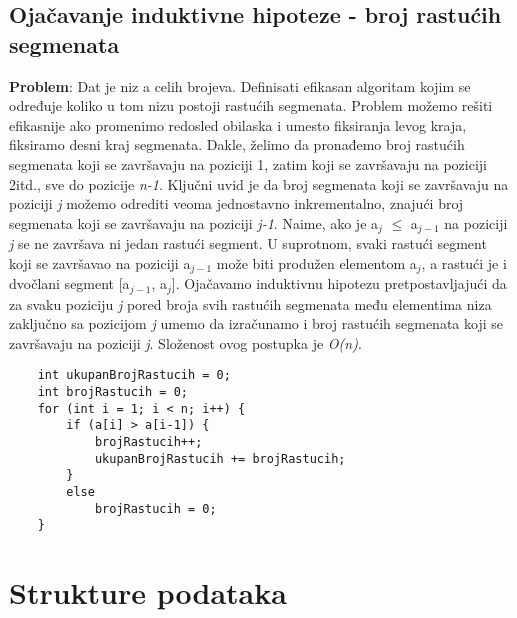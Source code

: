 \documentclass{article}
\begin{document}
\subsection{Ojačavanje induktivne hipoteze - broj rastućih segmenata}
\textbf{Problem}: Dat je niz a celih brojeva. Definisati efikasan algoritam kojim se određuje koliko u tom nizu postoji rastućih segmenata.
\newline Problem možemo rešiti efikasnije ako promenimo redosled obilaska i umesto fiksiranja levog kraja, fiksiramo desni kraj segmenata. Dakle, želimo da pronađemo
broj rastućih segmenata koji se završavaju na poziciji 1, zatim koji se završavaju
na poziciji 2itd., sve do pozicije \textit{n-1}.
Ključni uvid je da broj segmenata koji se završavaju na poziciji \textit{j} možemo odrediti
veoma jednostavno inkrementalno, znajući broj segmenata koji se završavaju
na poziciji \textit{j-1}. Naime, ako je a$_j$ $\leq$ a$_{j-1}$ na poziciji \textit{j} se ne završava ni jedan
rastući segment. U suprotnom, svaki rastući segment koji se završavao na poziciji
a$_{j-1}$ može biti produžen elementom a$_j$, a rastući je i dvočlani segment [a$_{j-1}$, a$_j$].
Ojačavamo induktivnu hipotezu pretpostavljajući da za svaku poziciju
\textit{j} pored broja svih rastućih segmenata među elementima niza zaključno sa
pozicijom \textit{j} umemo da izračunamo i broj rastućih segmenata koji se završavaju na poziciji \textit{j}. Složenost ovog postupka je \textit{O(n)}.
\begin{lstlisting}
    int ukupanBrojRastucih = 0;
    int brojRastucih = 0;
    for (int i = 1; i < n; i++) {
        if (a[i] > a[i-1]) {
            brojRastucih++;
            ukupanBrojRastucih += brojRastucih;
        } 
        else
            brojRastucih = 0;
    }
\end{lstlisting}


\newpage

\section{Strukture podataka}
\end{document}
